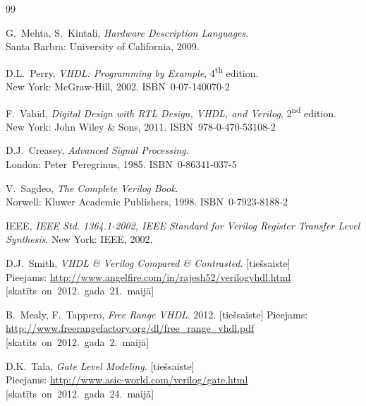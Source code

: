\documentclass[12pt,a4paper]{article}
\newcommand{\nd}{\textsuperscript{nd} }
\newcommand{\nth}{\textsuperscript{th} }
\begin{document}
	
	\clearpage
	{\raggedright
	\begin{thebibliography}{99}
			G.~Mehta, S.~Kintali,
			\textit{Hardware Description Languages}.\\
			Santa Barbra: University of California,
			2009.

			D.L.~Perry,
			\textit{VHDL: Programming by Example}, 4\nth edition.\\
			New York: McGraw-Hill, 2002. ISBN~0-07-140070-2

			F.~Vahid,
			\textit{Digital Design with RTL Design, VHDL, and Verilog},
			2\nd edition.\\
			New York: John Wiley \& Sons, 2011. ISBN~978-0-470-53108-2

			D.J.~Creasey,
			\textit{Advanced Signal Processing}.\\
			London: Peter~Peregrinus, 1985. ISBN~0-86341-037-5

			V.~Sagdeo,
			\textit{The Complete Verilog Book}.\\
			Norwell: Kluwer Academic Publishers, 1998. ISBN~0-7923-8188-2

			IEEE,
			\textit{IEEE Std. 1364.1-2002, IEEE Standard for Verilog Register Transfer Level Synthesis}.
			New York: IEEE, 2002.

			D.J.~Smith,
			\textit{VHDL \& Verilog Compared \& Contrasted}. [tiešsaiste]\\
			Pieejams: \url{http://www.angelfire.com/in/rajesh52/verilogvhdl.html}
			\mbox{[skatīts on 2012.~gada 21.~maijā]}

			B.~Mealy, F.~Tappero,
			\textit{Free Range VHDL}.
			2012. [tiešsaiste] \linebreak[2]
			Pieejams: \url{http://www.freerangefactory.org/dl/free_range_vhdl.pdf}\\
			\mbox{[skatīts on 2012.~gada 2.~maijā]}

			D.K.~Tala, \textit{Gate Level Modeling}. [tiešsaiste]\\
			Pieejams: \url{http://www.asic-world.com/verilog/gate.html}
			\mbox{[skatīts on 2012.~gada 24.~maijā]}


\end{thebibliography}}
\end{document}
